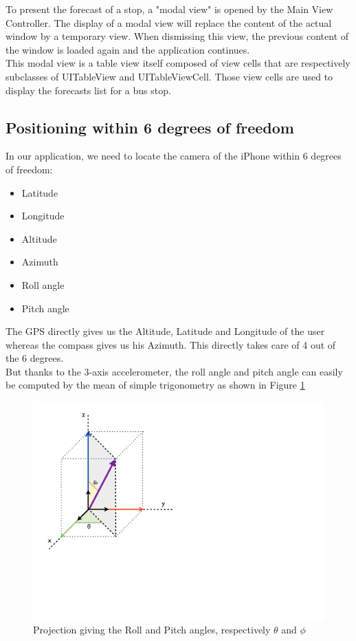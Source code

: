 To present the forecast of a stop, a "modal view" is opened by the Main View Controller.  The display of a modal view will replace the content of the actual window by a temporary view. When dismissing this view, the previous content of the window is loaded again and the application continues.\\

This modal view is a table view itself composed of view cells that are respectively subclasses of UITableView and UITableViewCell. Those view cells are used to display the forecasts list for a bus stop.

\subsection{Positioning within 6 degrees of freedom}

In our application, we need to locate the camera of the iPhone within 6 degrees of freedom:

\begin{itemize}
\item{Latitude}
\item{Longitude}
\item{Altitude}
\item{Azimuth}
\item{Roll angle}
\item{Pitch angle}
\end{itemize}

The GPS directly gives us the Altitude, Latitude and Longitude of the user whereas the compass gives us his Azimuth. This directly takes care of 4 out of the 6 degrees.\\

But thanks to the 3-axis accelerometer, the roll angle and pitch angle can easily be computed by the mean of simple trigonometry as shown in Figure \ref{fig:six_degrees_angles}

\begin{figure}[ht]
\center
\includegraphics[scale=0.5]{pics/six_degrees_angles}
\caption{Projection giving the Roll and Pitch angles, respectively $\theta$ and $\phi$}
\label{fig:six_degrees_angles}
\end{figure}


